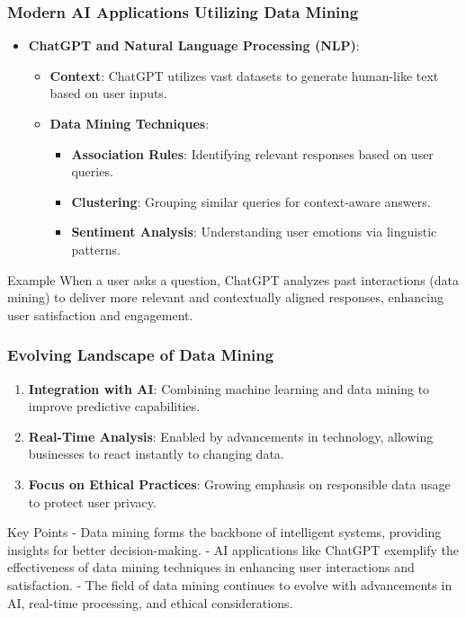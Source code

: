 \documentclass[aspectratio=169]{beamer}
\begin{document}
\begin{frame}[fragile]
  \frametitle{Modern AI Applications Utilizing Data Mining}

  \begin{itemize}
    \item \textbf{ChatGPT and Natural Language Processing (NLP)}:
      \begin{itemize}
        \item \textbf{Context}: ChatGPT utilizes vast datasets to generate human-like text based on user inputs.
        \item \textbf{Data Mining Techniques}:
          \begin{itemize}
            \item \textbf{Association Rules}: Identifying relevant responses based on user queries.
            \item \textbf{Clustering}: Grouping similar queries for context-aware answers.
            \item \textbf{Sentiment Analysis}: Understanding user emotions via linguistic patterns.
          \end{itemize}
      \end{itemize}
  \end{itemize}

  \begin{block}{Example}
    When a user asks a question, ChatGPT analyzes past interactions (data mining) to deliver more relevant and contextually aligned responses, enhancing user satisfaction and engagement.
  \end{block}

\end{frame}

\begin{frame}[fragile]
  \frametitle{Evolving Landscape of Data Mining}

  \begin{enumerate}
    \item \textbf{Integration with AI}: Combining machine learning and data mining to improve predictive capabilities.
    \item \textbf{Real-Time Analysis}: Enabled by advancements in technology, allowing businesses to react instantly to changing data.
    \item \textbf{Focus on Ethical Practices}: Growing emphasis on responsible data usage to protect user privacy.
  \end{enumerate}
  
  \begin{block}{Key Points}
    - Data mining forms the backbone of intelligent systems, providing insights for better decision-making.
    - AI applications like ChatGPT exemplify the effectiveness of data mining techniques in enhancing user interactions and satisfaction.
    - The field of data mining continues to evolve with advancements in AI, real-time processing, and ethical considerations.
  \end{block}

\end{frame}
\end{document}
